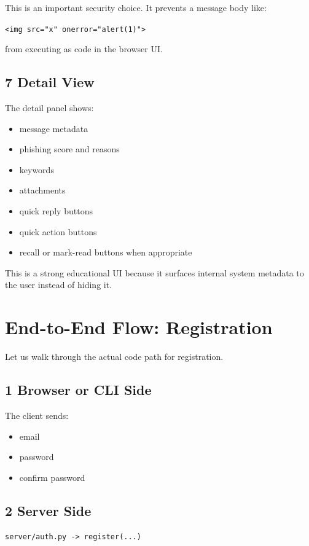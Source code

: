 \documentclass[11pt,a4paper]{article}
\begin{document}
This is an important security choice. It prevents a message body like:

\nolinkurl{<img src="x" onerror="alert(1)">}

from executing as code in the browser UI.

\subsection{7 Detail View}

The detail panel shows:

\begin{itemize}
\item message metadata
\item phishing score and reasons
\item keywords
\item attachments
\item quick reply buttons
\item quick action buttons
\item recall or mark-read buttons when appropriate
\end{itemize}

This is a strong educational UI because it surfaces internal system metadata to the user instead of hiding it.


\section{End-to-End Flow: Registration}

Let us walk through the actual code path for registration.

\subsection{1 Browser or CLI Side}

The client sends:

\begin{itemize}
\item email
\item password
\item confirm password
\end{itemize}

\subsection{2 Server Side}

\nolinkurl{server/auth.py -> register(...)}
\end{document}
